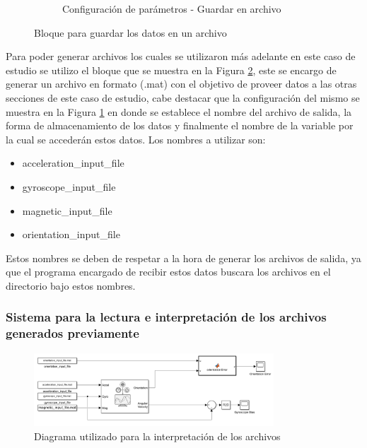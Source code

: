 \begin{figure}[htbp]
\begin{subfigure}[b]{0.45\textwidth}
        \caption{Configuración de parámetros - Guardar en archivo}
        \label{fig:config_to_file_IMU}
    \end{subfigure}
    \caption{Bloque para guardar los datos en un archivo}
    \label{fig:to_file_IMU}
\end{figure}

Para poder generar archivos los cuales se utilizaron más adelante en este caso de estudio se utilizo el bloque que se muestra en la Figura \ref{fig:to_file_IMU}, este se encargo de generar un archivo en formato (.mat) con el objetivo de proveer datos a las otras secciones de este caso de estudio, cabe destacar que la configuración del mismo se muestra en la Figura \ref{fig:config_to_file_IMU} en donde se establece el nombre del archivo de salida, la forma de almacenamiento de los datos y finalmente el nombre de la variable por la cual se accederán estos datos. Los nombres a utilizar son:

\begin{itemize}
    \item acceleration\_input\_file
    \item gyroscope\_input\_file
    \item magnetic\_input\_file
    \item orientation\_input\_file
\end{itemize}

Estos nombres se deben de respetar a la hora de generar los archivos de salida, ya que el programa encargado de recibir estos datos buscara los archivos en el directorio bajo estos nombres.

\newpage

\subsubsection{Sistema para la lectura e interpretación de los archivos generados previamente}

\begin{figure}[h!]
    \centering
    \includegraphics[width=0.8\textwidth]{fig/Capitulo5/Caso_de_estudio_IMU/Generador_de_salidas/flujo_lector_de_archivos.pdf}
    \caption{Diagrama utilizado para la interpretación de los archivos \cite{mathworks2024imu}}
    \label{fig:caso_de_estudio_2_IMU_interpretacion_de_archivos}
\end{figure}


